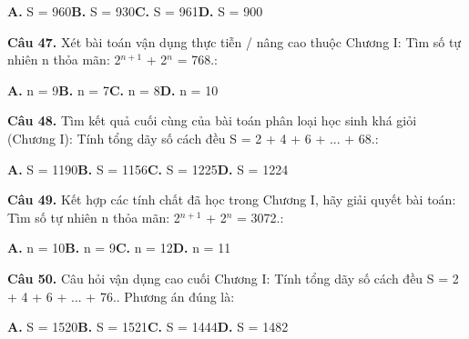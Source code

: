 \documentclass[11pt,a4paper]{article}
\begin{document}
\hspace*{1.5em}\textbf{A.} S = 960\quad\quad \textbf{B.} S = 930\quad\quad \textbf{C.} S = 961\quad\quad \textbf{D.} S = 900\par\vspace{2pt}
\textbf{\color{primary} Câu 47.} Xét bài toán vận dụng thực tiễn / nâng cao thuộc Chương I: Tìm số tự nhiên n thỏa mãn: 2$^{n + 1}$ + 2$^{n}$ = 768.:\par
\hspace*{1.5em}\textbf{A.} n = 9\quad\quad \textbf{B.} n = 7\quad\quad \textbf{C.} n = 8\quad\quad \textbf{D.} n = 10\par\vspace{2pt}
\textbf{\color{primary} Câu 48.} Tìm kết quả cuối cùng của bài toán phân loại học sinh khá giỏi (Chương I): Tính tổng dãy số cách đều S = 2 + 4 + 6 + ... + 68.:\par
\hspace*{1.5em}\textbf{A.} S = 1190\quad\quad \textbf{B.} S = 1156\quad\quad \textbf{C.} S = 1225\quad\quad \textbf{D.} S = 1224\par\vspace{2pt}
\textbf{\color{primary} Câu 49.} Kết hợp các tính chất đã học trong Chương I, hãy giải quyết bài toán: Tìm số tự nhiên n thỏa mãn: 2$^{n + 1}$ + 2$^{n}$ = 3072.:\par
\hspace*{1.5em}\textbf{A.} n = 10\quad\quad \textbf{B.} n = 9\quad\quad \textbf{C.} n = 12\quad\quad \textbf{D.} n = 11\par\vspace{2pt}
\textbf{\color{primary} Câu 50.} Câu hỏi vận dụng cao cuối Chương I: Tính tổng dãy số cách đều S = 2 + 4 + 6 + ... + 76.. Phương án đúng là:\par
\hspace*{1.5em}\textbf{A.} S = 1520\quad\quad \textbf{B.} S = 1521\quad\quad \textbf{C.} S = 1444\quad\quad \textbf{D.} S = 1482\par\vspace{2pt}
\end{document}

